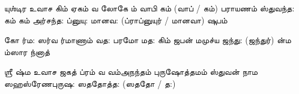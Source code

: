 \documentclass[10pt]{article}
\begin{document}
{\newpage
\slokad
{யுஶ்டிர உவாச}
{கிம் \hdspc ஏகம் வ லோகே} {ம் வாபி \hdspc {}கம் (வாப் / கம்) பராயணம்}
{ஸ்துவந்த: கம் கம் \hdspc அர்சந்த:} {ப்னுயு: \hdspc மானவ: (ப்ராப்னுயுர் / மானவா) ஷுபம்}

\slokas
{கோ ர்ம: ஸர்வ ர்மாணாம்}{ வத: பரமோ மத:}
{கிம் ஜபன் \hdspc மமுச்ய ஜந்து: (ஜந்துர்)}{ ன்ம ம்ஸார ந்னாத்}

\slokad 
{ஶ்ரீ ஷ்ம உவாச}
{ஜகத் ப்ரம் வ வம்}{அநந்தம் புருஷோத்தமம்}
{ஸ்துவன் \hdspc நாம ஸஹஸ்ரேண}{புருஷ: ஸததோத்த: (ஸததோ / த:)}
 
} 
\end{document}
